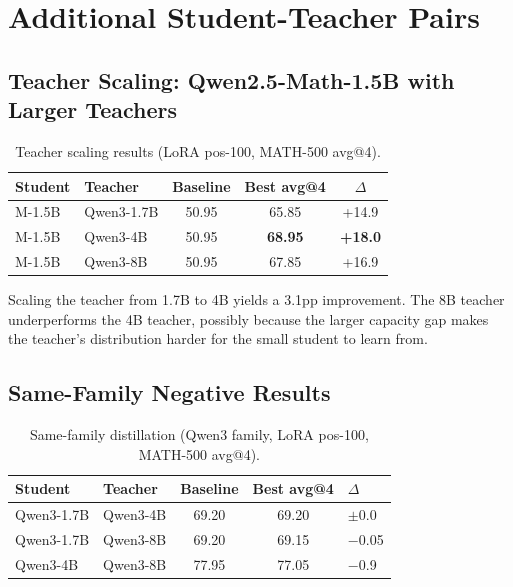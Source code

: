 \documentclass[10pt]{article}
\begin{document}
\section{Additional Student-Teacher Pairs}
\label{app:additional_pairs}

\subsection{Teacher Scaling: Qwen2.5-Math-1.5B with Larger Teachers}

\begin{table}[h]
\centering
\caption{Teacher scaling results (LoRA pos-100, MATH-500 avg@4).}
\small
\begin{tabular}{@{}llccc@{}}
\toprule
\textbf{Student} & \textbf{Teacher} & \textbf{Baseline} & \textbf{Best avg@4} & \textbf{$\Delta$} \\
\midrule
M-1.5B & Qwen3-1.7B & 50.95 & 65.85 & +14.9 \\
M-1.5B & Qwen3-4B   & 50.95 & \textbf{68.95} & \textbf{+18.0} \\
M-1.5B & Qwen3-8B   & 50.95 & 67.85 & +16.9 \\
\bottomrule
\end{tabular}
\end{table}

Scaling the teacher from 1.7B to 4B yields a 3.1pp improvement.
The 8B teacher underperforms the 4B teacher, possibly because the larger capacity gap makes the teacher's distribution harder for the small student to learn from.

\subsection{Same-Family Negative Results}

\begin{table}[h]
\centering
\caption{Same-family distillation (Qwen3 family, LoRA pos-100, MATH-500 avg@4).}
\small
\begin{tabular}{@{}llccl@{}}
\toprule
\textbf{Student} & \textbf{Teacher} & \textbf{Baseline} & \textbf{Best avg@4} & \textbf{$\Delta$} \\
\midrule
Qwen3-1.7B & Qwen3-4B & 69.20 & 69.20 & $\pm$0.0 \\
Qwen3-1.7B & Qwen3-8B & 69.20 & 69.15 & $-$0.05 \\
Qwen3-4B   & Qwen3-8B & 77.95 & 77.05 & $-$0.9 \\
\bottomrule
\end{tabular}
\end{table}
\end{document}
